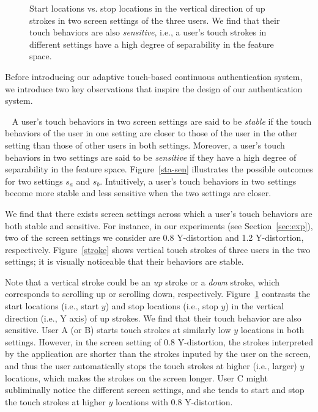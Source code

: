 \documentclass{sig-alternate-05-2015}
\newcommand{\myparatight}[1]{\smallskip\noindent{\bf {#1}:}~}
\begin{document}
\begin{figure*}[!t]
\centering
{}
\caption{Start locations vs. stop locations in the vertical direction of  up strokes 
in  two screen settings of the three users. We find that their touch behaviors
are also \emph{sensitive}, i.e.,  a user's touch
strokes in different settings have a high degree of separability in the feature space.}
\label{sensitive} 
\end{figure*}

Before introducing our adaptive touch-based continuous authentication system, we
introduce two key observations that inspire the design of our authentication
system. 




\myparatight{Stability and sensitivity} A user's touch behaviors in two screen
settings are said to be \emph{stable} if the touch behaviors of the user in one
setting are closer to those of the user in the other setting than those of other
users in both settings. Moreover, a user's touch behaviors in two settings are
said to be \emph{sensitive} if they have a high degree of separability in the
feature space. Figure~\ref{sta-sen} illustrates the possible outcomes for two
settings $s_a$ and $s_b$. Intuitively,  a user's touch behaviors in two settings become more
stable and less sensitive when the two settings are closer. 

We find that there exists screen settings across which a user's touch behaviors
are both stable and sensitive.   For instance, in our experiments (see
Section~\ref{sec:exp}), two of the screen settings we consider are 
0.8 Y-distortion and 1.2 Y-distortion,
respectively.  Figure~\ref{stroke} shows vertical touch strokes of three users
in the two settings; it is visually noticeable that their behaviors are stable. 

Note that a vertical stroke could be an \emph{up} stroke or a \emph{down} stroke, 
which corresponds to  scrolling up or scrolling down, respectively. 
Figure~\ref{sensitive} contrasts the start locations (i.e., start $y$)
and stop locations (i.e., stop $y$) in the vertical direction (i.e., Y axis)
of up strokes. We find that
their touch behavior are also sensitive. User A (or B) starts touch strokes at
similarly low $y$ locations in both settings. However, in the screen setting of 0.8
Y-distortion, the strokes interpreted by the application
are shorter than the strokes inputed by the user on the screen, and
thus the user automatically stops the touch strokes at higher (i.e., larger) $y$
locations, which makes the strokes on the screen longer. User C might subliminally notice the 
different screen settings, and
she tends to start and  stop the touch strokes at higher $y$ locations with 0.8 Y-distortion.     
\end{document}

